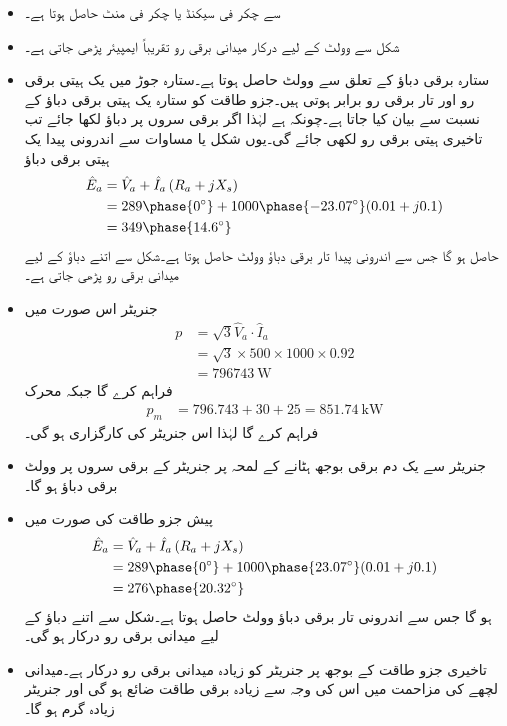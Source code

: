\begin{itemize}
\item
{} سے  چکر فی سیکنڈ یا  چکر فی منٹ حاصل ہوتا ہے۔
\item
شکل   سے    وولٹ کے لیے درکار میدانی برقی رو تقریباً  ایمپیئر پڑھی جاتی ہے۔
\item
ستارہ برقی دباؤ کے تعلق  سے   وولٹ حاصل ہوتا ہے۔ستارہ جوڑ میں یک ہیتی برقی رو اور تار برقی رو برابر ہوتی  ہیں۔جزو طاقت کو ستارہ یک ہیتی برقی دباؤ کے نسبت سے بیان کیا جاتا ہے۔چونکہ  ہے لہٰذا اگر برقی سروں پر دباؤ  لکھا جائے تب تاخیری ہیتی برقی رو   لکھی جائے گی۔یوں شکل  یا مساوات  سے اندرونی پیدا یک ہیتی برقی دباؤ
\begin{align*}
\hat{E}_a&=\hat{V}_{a}+\hat{I}_a \left(R_a+j X_s \right)\\
&= 289\phase{0 ^{\circ}}+1000 \phase {-23.07 ^{\circ}} ( 0.01 +j 0.1)\\
&=349\phase{14.6 ^{\circ}}
\end{align*}
حاصل ہو گا جس سے اندرونی پیدا تار برقی دباؤ  وولٹ حاصل ہوتا ہے۔شکل  سے اتنے دباؤ کے لیے   میدانی برقی رو پڑھی جاتی ہے۔
\item
جنریٹر اس صورت میں
\begin{align*}
p&=\sqrt{3} \hat{V}_{a} \cdot \hat{I}_a\\
&=\sqrt{3} \times 500 \times 1000 \times 0.92\\
&=\SI{796743}{\watt}
\end{align*}
فراہم کرے گا  جبکہ محرک 
\begin{align*}
p_m&=796.743+30+25=\SI{851.74}{\kilo \watt}
\end{align*}
فراہم کرے گا  لہٰذا اس جنریٹر کی کارگزاری  ہو گی۔ 
\item
جنریٹر سے یک دم برقی بوجھ ہٹانے کے  لمحہ پر جنریٹر کے برقی سروں پر   وولٹ برقی دباؤ ہو گا۔
\item
پیش جزو طاقت کی صورت میں
\begin{align*}
\hat{E}_a&=\hat{V}_{a}+\hat{I}_a \left(R_a+j X_s \right)\\
&= 289\phase{0 ^{\circ}}+1000 \phase {23.07 ^{\circ}} ( 0.01 +j 0.1)\\
&=276\phase{20.32 ^{\circ}}
\end{align*}
ہو گا جس سے اندرونی  تار برقی دباؤ  وولٹ حاصل ہوتا ہے۔شکل  سے اتنے دباؤ کے لیے   میدانی برقی رو درکار ہو گی۔
\item
تاخیری جزو طاقت کے بوجھ پر جنریٹر کو زیادہ میدانی برقی رو درکار ہے۔میدانی لچھے کی مزاحمت میں اس کی وجہ سے زیادہ برقی طاقت ضائع ہو گی اور جنریٹر  زیادہ گرم ہو گا۔
\end{itemize}
